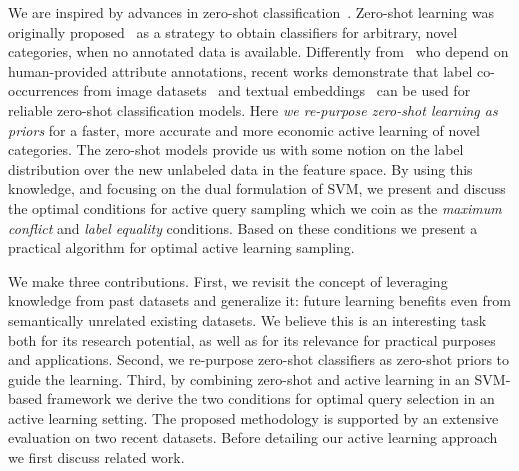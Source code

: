 \documentclass[10pt,twocolumn,letterpaper]{article}
\begin{document}
We are inspired by advances in zero-shot classification~\cite{MensinkCVPR2014, lampert13pami, akata13cvpr}. Zero-shot learning was originally proposed~\cite{lampert13pami,socher_NIPS2013} as a strategy to obtain classifiers for arbitrary, novel categories, when no annotated data is available. Differently from~\cite{lampert13pami, akata13cvpr} who depend on human-provided attribute annotations, recent works demonstrate that label co-occurrences from image datasets~\cite{MensinkCVPR2014} and textual embeddings~\cite{devise, conse} can be used for reliable zero-shot classification models. Here \emph{we re-purpose zero-shot learning as priors} for a faster, more accurate and more economic active learning of novel categories. The zero-shot models provide us with some notion on the label distribution over the new unlabeled data in the feature space. By using this knowledge, and focusing on the dual formulation of SVM, we present and discuss the optimal conditions for active query sampling which we coin as the \emph{maximum conflict} and \emph{label equality} conditions. Based on these conditions we present a practical algorithm for optimal active learning sampling.


We make three contributions. First, we revisit the concept of leveraging knowledge from past datasets and generalize it: future learning benefits even from semantically unrelated existing datasets. We believe this is an interesting task both for its research potential, as well as for its relevance for practical purposes and applications. Second, we re-purpose zero-shot classifiers as zero-shot priors to guide the learning. Third, by combining zero-shot and active learning in an SVM-based framework we derive the two conditions for optimal query selection in an active learning setting. The proposed methodology is supported by an extensive evaluation on two recent datasets. Before detailing our active learning approach we first discuss related work.
\end{document}
